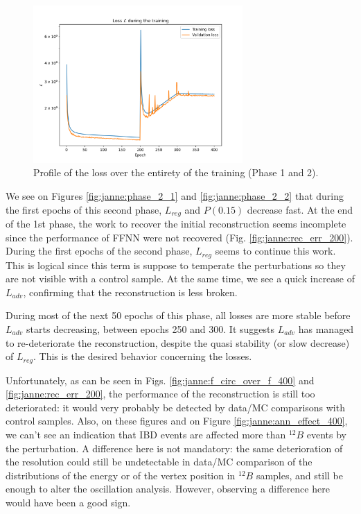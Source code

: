 \documentclass[../main.tex]{subfiles}
\begin{document}
\begin{figure}[ht]
  \centering
  \includegraphics[height=6cm]{images/janne/training/phase_all_l.png}
  \caption{Profile of the loss over the entirety of the training (Phase 1 and 2).}
  \label{fig:janne:phase_all}
\end{figure}


We see on Figures \ref{fig:janne:phase_2_1} and \ref{fig:janne:phase_2_2} that during the first epochs of this second phase, $L_{reg}$ and $P(0.15)$ decrease fast. At the end of the 1st phase, the
work to recover the initial reconstruction seems incomplete since the performance of FFNN were not recovered (Fig. \ref{fig:janne:rec_err_200}). During the first epochs of the second phase, $L_{reg}$ seems to continue this work. This is logical since this term is suppose to temperate the perturbations so they are not visible with a control sample.  At the same time, we see a quick increase of $L_{adv}$, confirming that the reconstruction is less broken.

During most of the next 50 epochs of this phase, all losses are more stable before $L_{adv}$ starts decreasing, between epochs 250 and 300. It suggests $L_{adv}$  has managed to re-deteriorate the reconstruction, despite the quasi stability  (or slow decrease) of $L_{reg}$. This is the desired behavior concerning the losses.

Unfortunately, as can be seen in Figs. \ref{fig:janne:f_circ_over_f_400} and \ref{fig:janne:rec_err_200}, the performance of the reconstruction is still too deteriorated: it would very probably be detected by data/MC comparisons with control samples. Also, on these figures and on Figure \ref{fig:janne:ann_effect_400}, we can't see an indication that IBD events are affected more than $^{12}B$ events by the perturbation. A difference here is not mandatory: the same deterioration of the resolution could still be undetectable in data/MC comparison of the distributions of the energy or of the vertex position  in $^{12}B$ samples, and still be enough to alter the oscillation analysis. However, observing a difference here would have been a good sign.
\end{document}

